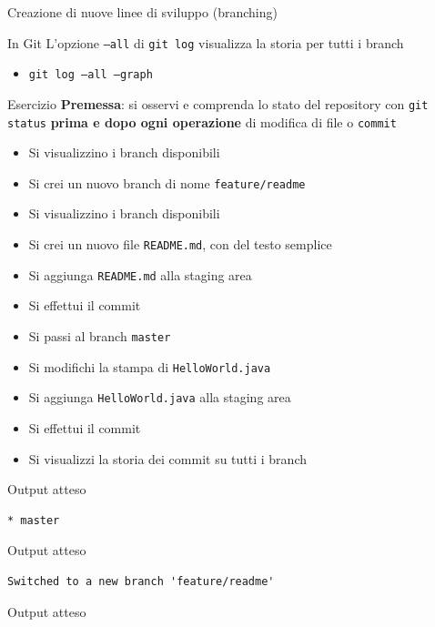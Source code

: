 \documentclass[xcolor=dvipsnames,presentation]{beamer}
\begin{document}
\begin{frame}{Creazione di nuove linee di sviluppo (branching)}
\begin{block}{In Git}
        L'opzione \texttt{--all} di \texttt{git log} visualizza la storia per tutti i branch
        \begin{itemize}
            \item \texttt{git log --all --graph}
        \end{itemize}
    \end{block}
    \begin{block}{Esercizio}
        \textbf{Premessa}: si osservi e comprenda lo stato del repository con \texttt{git status} \textbf{prima e dopo ogni operazione} di modifica di file o \texttt{commit}
        \begin{itemize}
            \footnotesize
            \item Si visualizzino i branch disponibili
            \item Si crei un nuovo branch di nome \texttt{feature/readme}
            \item Si visualizzino i branch disponibili
            \item Si crei un nuovo file \texttt{README.md}, con del testo semplice
            \item Si aggiunga \texttt{README.md} alla staging area
            \item Si effettui il commit
            \item Si passi al branch \texttt{master}
            \item Si modifichi la stampa di \texttt{HelloWorld.java}
            \item Si aggiunga \texttt{HelloWorld.java} alla staging area
            \item Si effettui il commit
            \item Si visualizzi la storia dei commit su tutti i branch
        \end{itemize}
    \end{block}
    \begin{block}{Output atteso}
        \begin{Verbatim}[fontsize=\scriptsize]
* master
        \end{Verbatim}
    \end{block}
    \begin{block}{Output atteso}
        \begin{Verbatim}[fontsize=\scriptsize]
Switched to a new branch 'feature/readme'
        \end{Verbatim}
    \end{block}
    \begin{block}{Output atteso}

\end{block}
\end{frame}
\end{document}
